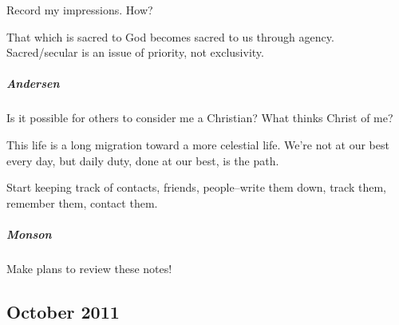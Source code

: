 Record my impressions. How?

That which is sacred to God becomes sacred to us through agency. Sacred/secular is an issue of priority, not exclusivity.

\subparagraph*{Andersen} Is it possible for others to consider me a Christian? What thinks Christ of me?

This life is a long migration toward a more celestial life. We're not at our best every day, but daily duty, done at our best, is the path.

Start keeping track of contacts, friends, people--write them down, track them, remember them, contact them.

\subparagraph*{Monson} Make plans to review these notes!

\subsection{October 2011}

